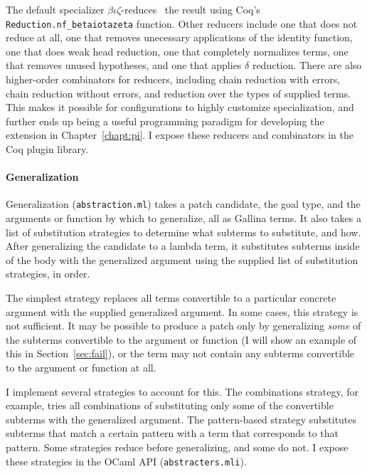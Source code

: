 The default specializer $\beta\iota\zeta$-reduces~\cite{equality} the result using Coq's
\lstinline{Reduction.nf_betaiotazeta} function. %
Other reducers include one that does not reduce at all, one that removes unecessary applications of the identity function, 
one that does weak head reduction, one that completely normalizes terms, one that removes unused hypotheses,
and one that applies $\delta$ reduction.
There are also higher-order combinators for reducers,
including chain reduction with errors, chain reduction without errors, and reduction over the types of supplied terms.
This makes it possible for configurations to highly customize specialization,
and further ends up being a useful programming paradigm for developing the \toolnamec extension in Chapter~\ref{chapt:pi}.
I expose these reducers and combinators in the Coq plugin library. %

\paragraph{Generalization} Generalization (\lstinline{abstraction.ml}) %
takes a patch candidate, the goal type, and the arguments or function by which to generalize,
all as Gallina terms.
It also takes a list of substitution strategies to determine what subterms to substitute, and how.
After generalizing the candidate to a lambda term, it substitutes subterms inside of the body with the generalized argument
using the supplied list of substitution strategies, in order.

The simplest strategy replaces all terms convertible to a particular concrete argument %
with the supplied generalized argument.
In some cases, this strategy is not sufficient.
It may be possible to produce a patch only by generalizing \emph{some} of the subterms
convertible to the argument or function (I will show an example of this in Section~\ref{sec:fail}),
or the term may not contain any subterms convertible to the argument or function at all.

I implement several strategies to account for this. The combinations strategy, for example,
tries all combinations of substituting only some of the convertible subterms with the generalized argument. 
The pattern-based strategy substitutes subterms that match a certain pattern
with a term that corresponds to that pattern.
Some strategies reduce before generalizing, and some do not.
I expose these strategies in the \sysname OCaml API (\lstinline{abstracters.mli}). %

